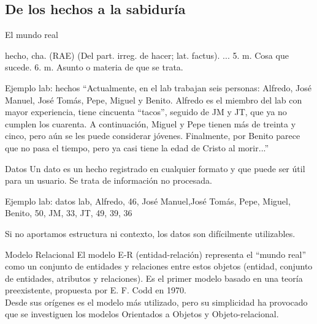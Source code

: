 \documentclass{classes/beamer_GeomaticaUA}
\begin{document}
\subsection{De los hechos a la sabiduría}
\begin{frame}{El mundo real}

\begin{block}{hecho, cha. (RAE)}
(Del part. irreg. de hacer; lat. factus).
...
5. m. Cosa que sucede.
6. m. Asunto o materia de que se trata.
\end{block}

\begin{exampleblock}{Ejemplo lab: hechos}
``Actualmente, en el lab trabajan seis personas: Alfredo, José Manuel, José Tomás, Pepe, Miguel y Benito. Alfredo es el miembro del lab con mayor experiencia, tiene cincuenta ``tacos'', seguido de JM y JT, que ya no cumplen los cuarenta. A continuación, Miguel y Pepe tienen más de treinta y cinco, pero aún se les puede considerar jóvenes. Finalmente, por Benito parece que no pasa el tiempo, pero ya casi tiene la edad de Cristo al morir...''
\end{exampleblock}

\end{frame}

\begin{frame}{Datos}
Un dato es un hecho registrado en cualquier formato y que puede ser útil para un usuario. Se trata de información no procesada.

\begin{exampleblock}{Ejemplo lab: datos}
lab, Alfredo, 46, José Manuel,José Tomás, Pepe, Miguel, Benito, 50, JM, 33, JT, 49, 39, 36
\end{exampleblock}

Si no aportamos estructura ni contexto, los datos son difícilmente utilizables.

\end{frame}

\begin{frame}{Modelo Relacional}
El modelo E-R (entidad-relación) representa el ``mundo real'' como un conjunto de entidades y relaciones entre estos objetos (entidad, conjunto de entidades, atributos y relaciones). Es el primer modelo basado en una teoría preexistente, propuesta por E. F. Codd en 1970. \\[3ex]

Desde sus orígenes es el modelo más utilizado, pero su simplicidad ha provocado que se investiguen los modelos Orientados a Objetos y Objeto-relacional.
\end{frame}
\end{document}
